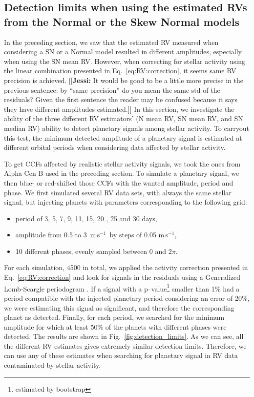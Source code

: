 \documentclass{aa}
\def\ms{\hbox{\,m\,s$^{-1}$}}         %
\newcommand{\jessi}[1]{{\color{Purple}[[\textbf{Jessi: }#1]]}}
\begin{document}
\subsection{Detection limits when using the estimated RVs from the Normal or the Skew Normal models} \label{sec:detect_limits}

In the preceding section, we saw that the estimated RV measured when considering a SN or a Normal model resulted in different amplitudes, especially when using the SN mean RV. However, when correcting for stellar activity using the linear combination presented in Eq.~\ref{eq:RV:correction}, it seems same RV precision is achieved.  \jessi{It would be good to be a little more precise in the previous sentence:  by ``same precision'' do you mean the same std of the residuals?  Given the first sentence the reader may be confused because it says they have different amplitudes estimated.}
In this section, we investigate the ability of the three different RV estimators' (N mean RV, SN mean RV, and SN median RV) ability to detect planetary signals among stellar activity.
To carryout this test, the minimum detected amplitude of a planetary signal is estimated at different orbital periods when considering data affected by stellar activity.

To get CCFs affected by realistic stellar activity signals, we took the ones from Alpha Cen B used in the preceding section. To simulate a planetary signal, we then blue- or red-shifted those CCFs with the wanted amplitude, period and phase.
We first simulated several RV data sets, with always the same stellar signal, but injecting planets with parameters corresponding to the following grid:
\begin{itemize}
\item period of 3, 5, 7, 9, 11, 15, 20 , 25 and 30 days,
\item amplitude from 0.5 to 3 \ms\, by steps of 0.05\,\ms,
\item 10 different phases, evenly sampled between 0 and 2$\pi$.
\end{itemize}

For each simulation, 4500 in total, we applied the activity correction presented in Eq.~\ref{eq:RV:correction} and look for signals in the residuals using a Generalized Lomb-Scargle periodogram \citep[][]{Zechmeister-2009,Scargle-1982,Lomb-1976a}. If a signal with a p--value\footnote{estimated by bootstrap} smaller than 1\% had a period compatible with the injected planetary period considering an error of 20\%, we were estimating this signal as significant, and therefore the corresponding planet as detected. Finally, for each period, we searched for the minimum amplitude for which at least 50\% of the planets with different phases were detected. The results are shown in Fig.~\ref{fig:detection_limits}. As we can see, all the different RV estimates gives extremely similar detection limits. Therefore, we can use any of these estimates when searching for planetary signal in RV data contaminated by stellar activity.
\end{document}
